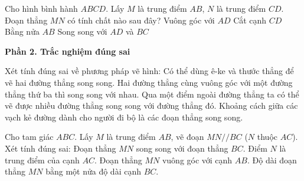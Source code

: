 \begin{ex} %
Cho hình bình hành $ABCD$. Lấy $M$ là trung điểm $AB$, $N$ là trung điểm $CD$. Đoạn thẳng $MN$ có tính chất nào sau đây?
\choice
{Vuông góc với $AD$}
{Cắt cạnh $CD$}
{Bằng nửa $AB$}
{\True Song song với $AD$ và $BC$}
\end{ex}

\textbf{Phần 2. Trắc nghiệm đúng sai}

\begin{ex} %
Xét tính đúng sai về phương pháp vẽ hình:
\choiceTF
{\True Có thể dùng ê-ke và thước thẳng để vẽ hai đường thẳng song song.}
{\True Hai đường thẳng cùng vuông góc với một đường thẳng thứ ba thì song song với nhau.}
{Qua một điểm ngoài đường thẳng ta có thể vẽ được nhiều đường thẳng song song với đường thẳng đó.}
{\True Khoảng cách giữa các vạch kẻ đường dành cho người đi bộ là các đoạn thẳng song song.}
\end{ex}

\begin{ex} %
Cho tam giác $ABC$. Lấy $M$ là trung điểm $AB$, vẽ đoạn $MN // BC$ ($N$ thuộc $AC$). Xét tính đúng sai:
\choiceTF
{\True Đoạn thẳng $MN$ song song với đoạn thẳng $BC$.}
{\True Điểm $N$ là trung điểm của cạnh $AC$.}
{Đoạn thẳng $MN$ vuông góc với cạnh $AB$.}
{\True Độ dài đoạn thẳng $MN$ bằng một nửa độ dài cạnh $BC$.}
\end{ex}

